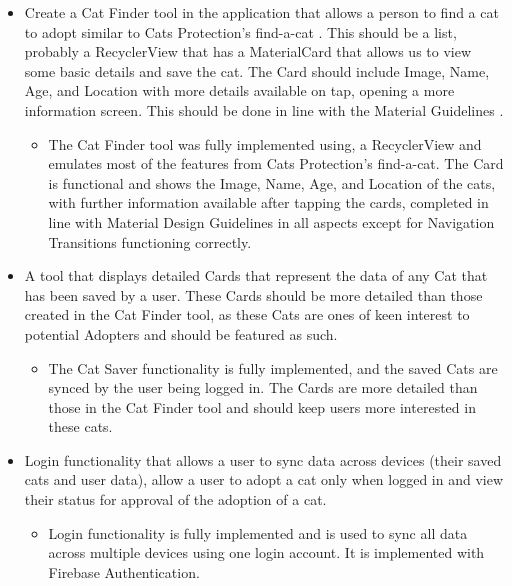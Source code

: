 \begin{itemize}
    \item Create a Cat Finder tool in the application that allows a person to find a cat to adopt similar to Cats Protection's find-a-cat \cite{CATSPROTECTION}. This should be a list, probably a RecyclerView that has a Material\gls{Card} that allows us to view some basic details and save the cat. The Card should include Image, Name, Age, and Location with more details available on tap, opening a more information screen. This should be done in line with the Material Guidelines \cite{MATERIALDESIGNGUIDELINES}.
    \begin{itemize}
        \item The Cat Finder tool was fully implemented using, a RecyclerView and emulates most of the features from Cats Protection's find-a-cat. The \gls{Card} is functional and shows the Image, Name, Age, and Location of the cats, with further information available after tapping the cards, completed in line with Material Design Guidelines in all aspects except for Navigation Transitions functioning correctly.
    \end{itemize}
    
    \item A tool that displays detailed \gls{Card}s that represent the data of any Cat that has been saved by a user. These \gls{Card}s should be more detailed than those created in the Cat Finder tool, as these Cats are ones of keen interest to potential Adopters and should be featured as such.
    \begin{itemize}
        \item The Cat Saver functionality is fully implemented, and the saved Cats are synced by the user being logged in. The \gls{Card}s are more detailed than those in the Cat Finder tool and should keep users more interested in these cats.
    \end{itemize}
    
    \item Login functionality that allows a user to sync data across devices (their saved cats and user data), allow a user to adopt a cat only when logged in and view their status for approval of the adoption of a cat.
    \begin{itemize}
        \item Login functionality is fully implemented and is used to sync all data across multiple devices using one login account. It is implemented with Firebase Authentication.
    \end{itemize}
    

\end{itemize}
